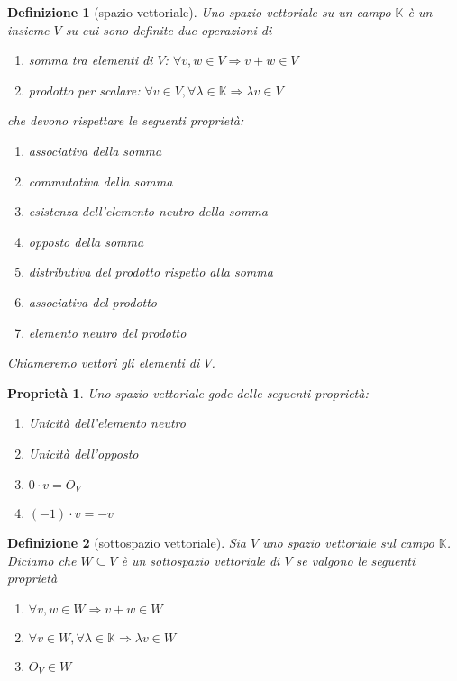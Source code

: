 \documentclass[9pt, a4paper]{article}
\newcommand{\K}{\mathbb{K}}
\newcommand{\letvs}{Sia $ V $ uno spazio vettoriale sul campo $ \K $}
\theoremstyle{mythm}
\newtheorem{definition}{Definizione}[section]
\newtheorem{propriety}{Proprietà}[section]
\begin{document}
\begin{definition}[spazio vettoriale]
	Uno spazio vettoriale su un campo $ \K $ è un insieme  $ V $ su cui sono definite due operazioni di 
	\begin{enumerate}
		\item \emph{somma} tra elementi di $ V $: $ \forall v, w \in V \Rightarrow v + w \in V $
		\item \emph{prodotto per scalare}: $ \forall v \in V, \forall \lambda \in \K \Rightarrow\lambda v \in V $
	\end{enumerate}
	che devono rispettare le seguenti proprietà:
	\begin{enumerate}[label=(\roman*)]
		\item \emph{associativa della somma}
		\item \emph{commutativa della somma}
		\item \emph{esistenza dell'elemento neutro della somma}
		\item \emph{opposto della somma}
		\item \emph{distributiva del prodotto rispetto alla somma}
		\item \emph{associativa del prodotto}
		\item \emph{elemento neutro del prodotto}
	\end{enumerate}
	Chiameremo \emph{vettori} gli elementi di $ V $.
\end{definition}

\begin{propriety} Uno spazio vettoriale gode delle seguenti proprietà:
	\begin{enumerate}
		\item Unicità dell'elemento neutro
		\item Unicità dell'opposto
		\item $ 0 \cdot v = O_V $
		\item $ (-1) \cdot v = -v $
	\end{enumerate}
\end{propriety}

\begin{definition}[sottospazio vettoriale]
	\letvs. Diciamo che $ W \subseteq V $ è un sottospazio vettoriale di $ V $ se valgono le seguenti proprietà
	\begin{enumerate}[label=(\roman*)]
		\item $ \forall v, w \in W \Rightarrow v + w \in W $
		\item $ \forall v \in W, \forall \lambda \in \K \Rightarrow \lambda v \in W $
		\item $ O_V \in W $
	\end{enumerate}
\end{definition}
\end{document}
